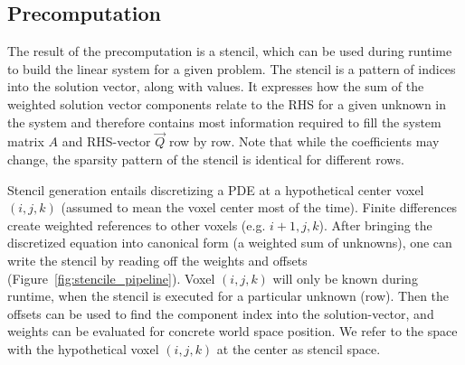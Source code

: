 \subsection{Precomputation}
\label{sec:solver_precomputation}

The result of the precomputation is a stencil, which can be used during runtime to build the linear system for a given problem. The stencil is a pattern of indices into the solution vector, along with values. It expresses how the sum of the weighted solution vector components relate to the RHS for a given unknown in the system and therefore contains most information required to fill the system matrix $A$ and RHS-vector $\vec{Q}$ row by row. Note that while the coefficients may change, the sparsity pattern of the stencil is identical for different rows.



\vspace{0.6in}

Stencil generation entails discretizing a PDE at a hypothetical center voxel $(i, j, k)$ (assumed to mean the voxel center most of the time). Finite differences create weighted references to other voxels (e.g. $i+1, j, k$). After bringing the discretized equation into canonical form (a weighted sum of unknowns), one can write the stencil by reading off the weights and offsets (Figure~\ref{fig:stencile_pipeline}). Voxel $(i, j, k)$ will only be known during runtime, when the stencil is executed for a particular unknown (row). Then the offsets can be used to find the component index into the solution-vector, and weights can be evaluated for concrete world space position. We refer to the space with the hypothetical voxel $(i, j, k)$ at the center as stencil space.

\vspace{0.1in}


